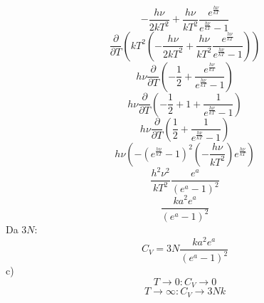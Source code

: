 \documentclass{article}
\begin{document}
    \begin{equation*}
        -\frac{h\nu}{2kT^2}+\frac{h\nu}{kT^2}\frac{e^{\frac{h\nu}{kT}}}{e^{\frac{h\nu}{kT}}-1}
    \end{equation*}
    \begin{equation*}
        \frac{\partial}{\partial T}\left(kT^2 \left(-\frac{h\nu}{2kT^2}+\frac{h\nu}{kT^2}\frac{e^{\frac{h\nu}{kT}}}{e^{\frac{h\nu}{kT}}-1}\right)\right)
    \end{equation*}
    \begin{equation*}
        h\nu\frac{\partial}{\partial T}\left(-\frac{1}{2}+\frac{e^{\frac{h\nu}{kT}}}{e^{\frac{h\nu}{kT}}-1}\right)
    \end{equation*}
    \begin{equation*}
        h\nu\frac{\partial}{\partial T}\left(-\frac{1}{2}+1+\frac{1}{e^{\frac{h\nu}{kT}}-1}\right)
    \end{equation*}
    \begin{equation*}
        h\nu\frac{\partial}{\partial T}\left(\frac{1}{2}+\frac{1}{e^{\frac{h\nu}{kT}}-1}\right)
    \end{equation*}
    \begin{equation*}
        h\nu\left(-\left(e^{\frac{h\nu}{kT}}-1\right)^2\left(-\frac{h\nu}{kT^2}\right)e^{\frac{h\nu}{kT}}\right)
    \end{equation*}
    \begin{equation*}
        \frac{h^2\nu^2}{kT^2}\frac{e^a}{(e^a-1)^2}
    \end{equation*}
    \begin{equation*}
        \frac{ka^2e^a}{(e^a-1)^2}
    \end{equation*}
        Da $3N$:
        \begin{equation*}
            C_V = 3N\frac{ka^2e^a}{(e^a-1)^2}
        \end{equation*}
    c)\begin{equation*}
        T \to 0: C_V \to 0
    \end{equation*}
    \begin{equation*}
        T \to \infty: C_V \to 3Nk
    \end{equation*}
\end{document}
